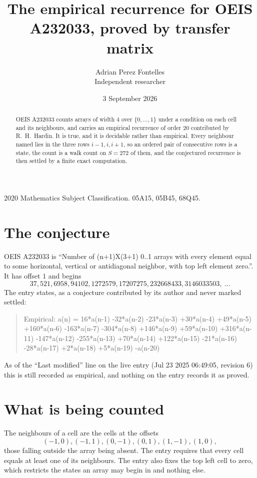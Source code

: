 \documentclass[11pt,a4paper]{article}
\title{The empirical recurrence for OEIS A232033, proved by transfer matrix}
\author{Adrian Perez Fontelles\\ \small Independent researcher}
\date{3 September 2026}
\theoremstyle{plain}
\theoremstyle{definition}
\begin{document}
\maketitle

\begin{abstract}
OEIS A232033 counts arrays of width $4$ over $\{0,\dots,1\}$ under a condition on each cell
and its neighbours, and carries an empirical recurrence of order $20$ contributed by
R.~H.~Hardin. It is true, and it is decidable rather than empirical. Every neighbour named lies
in the three rows $i-1,i,i+1$, so an ordered pair of consecutive rows is a state, the count is
a walk count on $S=272$ of them, and the conjectured recurrence is then settled by a finite
exact computation.
\end{abstract}

\noindent\small 2020 Mathematics Subject Classification. 05A15, 05B45, 68Q45.\normalsize

\section{The conjecture}

OEIS A232033 is ``Number of (n+1)X(3+1) 0..1 arrays with every element equal to some horizontal, vertical or antidiagonal neighbor, with top left element zero.''. It has offset $1$ and begins
\[
37, 521, 6958, 94102, 1272579, 17207275, 232668433, 3146033503,\ \dots
\]
The entry states, as a conjecture contributed by its author and never marked settled:
\begin{quote}
Empirical: a(n) = 16*a(n-1) -32*a(n-2) -23*a(n-3) +30*a(n-4) +49*a(n-5) +160*a(n-6) -163*a(n-7) -304*a(n-8) +146*a(n-9) +59*a(n-10) +316*a(n-11) -147*a(n-12) -255*a(n-13) +70*a(n-14) +122*a(n-15) -21*a(n-16) -28*a(n-17) +2*a(n-18) +5*a(n-19) -a(n-20)
\end{quote}
As of the ``Last modified'' line on the live entry (Jul 23 2025 06:49:05, revision 6) this is still
recorded as empirical, and nothing on the entry records it as proved.

\section{What is being counted}

The neighbours of a cell are the cells at the offsets
\[
(-1,0), (-1,1), (0,-1), (0,1), (1,-1), (1,0),
\]
those falling outside the array being absent. The entry requires that every cell equals at least one of its neighbours. The entry also fixes the top left cell to zero, which restricts the states an array may begin in and nothing else.
\end{document}
